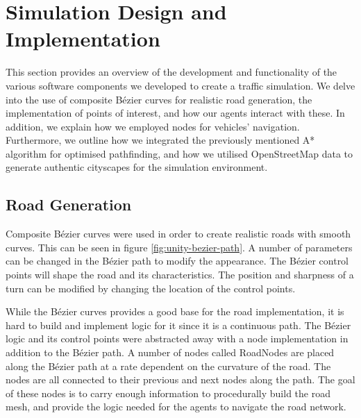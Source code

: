 \section{Simulation Design and Implementation}
    This section provides an overview of the development and functionality of the various software components we developed to create a traffic simulation. We delve into the use of composite Bézier curves for realistic road generation, the implementation of points of interest, and how our agents interact with these. In addition, we explain how we employed nodes for vehicles' navigation. Furthermore, we outline how we integrated the previously mentioned A* algorithm for optimised pathfinding, and how we utilised OpenStreetMap data to generate authentic cityscapes for the simulation environment.



    \subsection{Road Generation}
        Composite Bézier curves were used in order to create realistic roads with smooth curves. This can be seen in figure \ref{fig:unity-bezier-path}. A number of parameters can be changed in the Bézier path to modify the appearance. The Bézier control points will shape the road and its characteristics. The position and sharpness of a turn can be modified by changing the location of the control points.
        
    
        While the Bézier curves provides a good base for the road implementation, it is hard to build and implement logic for it since it is a continuous path. The Bézier logic and its control points were abstracted away with a node implementation in addition to the Bézier path. A number of nodes called RoadNodes are placed along the Bézier path at a rate dependent on the curvature of the road. The nodes are all connected to their previous and next nodes along the path. The goal of these nodes is to carry enough information to procedurally build the road mesh, and provide the logic needed for the agents to navigate the road network.
    
